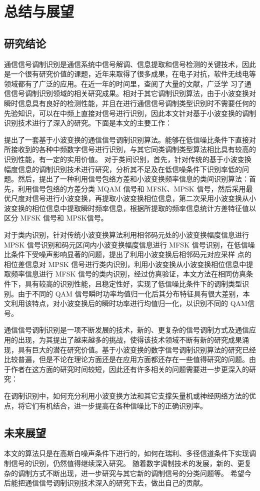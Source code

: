 \chapter{总结与展望}
\section{研究结论}
通信信号调制识别是通信系统中信号解调、信息提取和信号检测的关键技术，因此是一个很有研究价值的课题，近年来取得了很多成果，在电子对抗，软件无线电等领域都有了广泛的应用。在近一年的时间里，查阅了大量的文献，广泛学
习了通信信号调制识别领域的相关研究成果。相对于其它调制识别算法，由于小波变换对瞬时信息具有良好的检测性能，并且在进行通信信号调制类型识别时不需要任何的先验知识，可以在中频上直接对信号进行识别，因此本文针对基于小波变换的调制识别技术进行了深入的研究。下面是本文的主要工作： \par

提出了一套基于小波变换的通信信号调制识别算法。能够在低信噪比条件下直接对所接收到的各种中频数字信号进行识别，与其它同类调制类型算法相比具有较高的识别性能，有一定的实用价值。 对于类间识别，首先，针对传统的基于小波变换幅度信息的调制识别技术进行研究，分析其不足及在低信噪条件下识别率低的问题。然后，提出了一种利用信号包络方差和小波变换频率信息的类间识别算法：首先，利用信号包络的方差分类 MQAM 信号和 MFSK、MPSK 信号，然后采用最优尺度对信号进行小波变换，再提取小波变换相位信息，第二次采用小波变换从小波变换的相位信息中提取瞬时频率信息，根据所提取的频率信息统计方差特征值以区分 MFSK 信号和 MPSK信号。 \par

对于类内识别，针对传统小波变换算法利用相邻码元处的小波变换幅度信息进行 MPSK 信号识别和码元区间内小波变换幅度信息进行 MFSK 信号识别，在低信噪比条件下受噪声影响显著的问题，提出了利用小波变换后相邻码元对应采样
点的相位差信息对 MPSK 信号进行类内识别，利用小波变换从小波变换相位信息中提取频率信息进行 MFSK 信号的类内识别，经过仿真验证，本文方法在相同仿真条件下，具有较高的识别性能，且稳定性好，实现了低信噪比条件下的调制类型识别。由于不同的 QAM 信号瞬时功率均值归一化后其分布特征具有很大差别，本文利用该特点，对小波变换后的瞬时功率进行均值归一化，以识别不同的 QAM信号。 \par

通信信号调制识别是一项不断发展的技术，新的、更复杂的信号调制方式及通信应用的出现，为其提出了越来越多的挑战，使得该技术领域不断有新的研究成果涌现，具有巨大的潜在研究价值。基于小波变换的数字信号调制识别算法的研究已经比较普遍，但是不论在理论方面还是在应用方面都还存在一些值得研究的问题。由于作者在这方面的研究时间较短，因此还有许多相关的问题需要进一步更深入的研究： \par

在调制识别中，如何充分利用小波变换方法和其它支撑矢量机或神经网络方法的优点，将它们有机结合，进一步提高在各种信噪比下的正确识别率。 \par
\section{未来展望}
本文的算法只是在高斯白噪声条件下进行的，如何在瑞利、多径信道条件下实现调制信号的识别，仍然值得继续深入研究。 随着数字调制技术的发展，新的、更复杂的调制方式不断出现，进一步研究与其它新的调制信号的分类问题等。 
希望今后能把通信信号调制识别技术深入的研究下去，做出自己的贡献。\par
